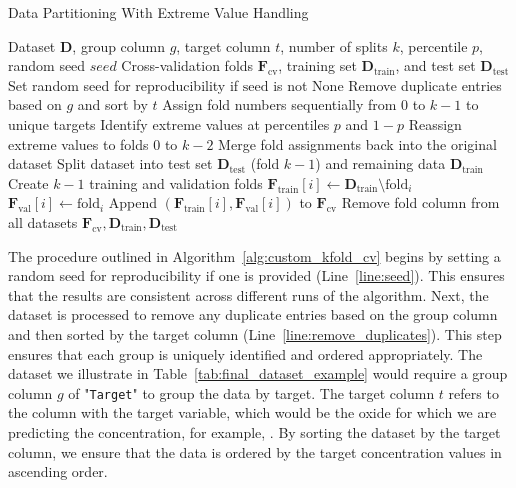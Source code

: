\begin{algorithm}
\caption{Data Partitioning With Extreme Value Handling}
\label{alg:custom_kfold_cv}
\begin{algorithmic}[1]
\Require Dataset \( \mathbf{D} \), group column \( g \), target column \( t \), number of splits \( k \), percentile \( p \), random seed \( \textit{seed} \)
\Ensure Cross-validation folds \( \mathbf{F}_\text{cv} \), training set \( \mathbf{D}_\text{train} \), and test set \( \mathbf{D}_\text{test} \)
\State \label{line:seed} Set random seed for reproducibility if \(\text{seed} \) is not None
\State \label{line:remove_duplicates} Remove duplicate entries based on \( g \) and sort by \( t \)
\State \label{line:assign_folds} Assign fold numbers sequentially from 0 to \( k-1 \) to unique targets
    \State \label{line:identify_extremes} Identify extreme values at percentiles \( p \) and \( 1-p \)
    \State \label{line:reassign_extremes} Reassign extreme values to folds \( 0 \) to \( k-2 \)
\EndIf
\State \label{line:merge_folds} Merge fold assignments back into the original dataset
\State \label{line:split_dataset} Split dataset into test set \( \mathbf{D}_\text{test} \) (fold \( k-1 \)) and remaining data \( \mathbf{D}_\text{train} \)
\State \label{line:create_folds} Create \( k-1 \) training and validation folds
    \State \( \mathbf{F}_\text{train}[i] \gets \mathbf{D}_\text{train} \setminus \text{fold}_i \)
    \State \( \mathbf{F}_\text{val}[i] \gets \text{fold}_i \)
    \State Append \((\mathbf{F}_\text{train}[i], \mathbf{F}_\text{val}[i])\) to \(\mathbf{F}_\text{cv}\)
\EndFor
\State \label{line:remove_fold_column} Remove fold column from all datasets
\State \Return \( \mathbf{F}_\text{cv}, \mathbf{D}_\text{train}, \mathbf{D}_\text{test} \)
\end{algorithmic}
\end{algorithm}

The procedure outlined in Algorithm~\ref{alg:custom_kfold_cv} begins by setting a random seed for reproducibility if one is provided (Line~\ref{line:seed}).
This ensures that the results are consistent across different runs of the algorithm.
Next, the dataset is processed to remove any duplicate entries based on the group column and then sorted by the target column (Line~\ref{line:remove_duplicates}).
This step ensures that each group is uniquely identified and ordered appropriately.
The dataset we illustrate in Table~\ref{tab:final_dataset_example} would require a group column $g$ of "\texttt{Target}" to group the data by target.
The target column $t$ refers to the column with the target variable, which would be the oxide for which we are predicting the concentration, for example, .
By sorting the dataset by the target column, we ensure that the data is ordered by the target concentration values in ascending order.

